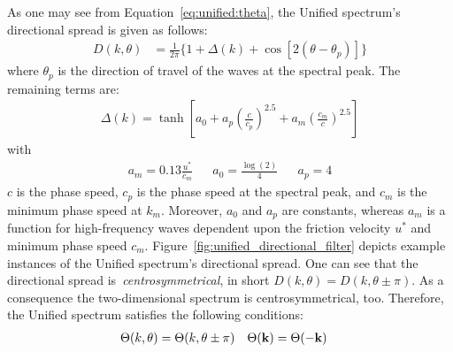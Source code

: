 As one may see from Equation~\ref{eq:unified:theta}, the Unified spectrum's
directional spread is given as follows:
%
\begin{align}
D(k, \theta) &= \frac{1}{2\pi}\{1 + \Delta(k) + \cos[2(\theta - 
\theta_p)]\}
\end{align}
where $\theta_p$ is the direction of travel of the waves at the spectral peak.
The remaining terms are:
\begin{align*}
\Delta(k) = \tanh\left[a_0 + a_p\left(\frac{c}{c_p}\right)^{2.5} + 
a_m\left(\frac{c_m}{c}\right)^{2.5}\right]
\end{align*}
with
\begin{align*}
a_m = 0.13 \frac{u^{\ast}}{c_m} && a_0 = \frac{\log(2)}{4} && a_p = 4
\end{align*}
$c$ is the phase speed, $c_p$ is the phase speed at the spectral peak, and $c_m$
is the minimum phase speed at $k_m$. Moreover, $a_0$ and $a_p$ are constants,
whereas $a_m$ is a function for high-frequency waves dependent upon the friction
velocity $u^\ast$ and minimum phase speed $c_m$.
Figure~\ref{fig:unified_directional_filter} depicts example
instances of the Unified spectrum's directional spread. One can see that the
directional spread is~\emph{centrosymmetrical}, in short
$D(k, \theta) = D(k, \theta \pm \pi)$. As a consequence the two-dimensional
\wavenumber spectrum is centrosymmetrical, too. Therefore, the Unified spectrum
satisfies the following conditions:
\begin{align*}
\Theta(k, \theta) &= \Theta(k, \theta \pm \pi) & \Theta(\mathbf{k}) &= \Theta(-\mathbf{k})
\end{align*}
%
